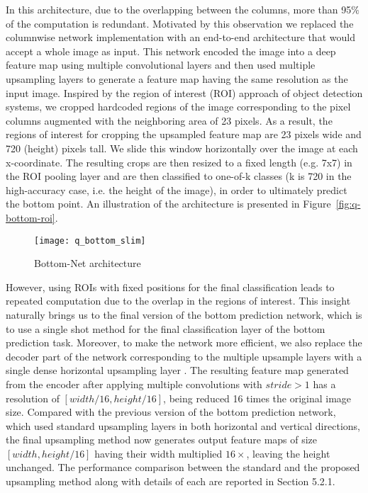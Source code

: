 \documentclass[10pt,twocolumn,letterpaper]{article}
\begin{document}
In this architecture, due to the overlapping between the columns, more than 95$\%$ of the computation is redundant. Motivated by this observation we replaced the columnwise network implementation with an end-to-end architecture that would accept a whole image as input. This network encoded the image into a deep feature map using multiple convolutional layers and then used multiple upsampling layers to generate a feature map having the same resolution as the input image. Inspired by the region of interest (ROI) approach of object detection systems, we cropped hardcoded regions of the image corresponding to the pixel columns augmented with the neighboring area of 23 pixels. As a result, the regions of interest for cropping the upsampled feature map are 23 pixels wide and 720 (height) pixels tall. We slide this window horizontally over the image at each x-coordinate. The resulting crops are then resized to a fixed length (e.g. 7x7) in the ROI pooling layer and are then classified to one-of-k classes (k is 720 in the high-accuracy case, i.e. the height of the image), in order to ultimately predict the bottom point. An illustration of the architecture is presented in Figure~\ref{fig:q-bottom-roi}. 
\begin{figure*}
\begin{center}
\texttt{[image: q\_bottom\_slim]}
\end{center}
   \caption{Bottom-Net architecture}
\label{fig:q_bottom_slim}
\end{figure*}

However, using ROIs with fixed positions for the final classification leads to repeated computation due to the overlap in the regions of interest. This insight naturally brings us to the final version of the bottom prediction network, which is to use a single shot method for the final classification layer of the bottom prediction task. Moreover, to make the network more efficient, we also replace the decoder part of the network corresponding to the multiple upsample layers with a single dense horizontal upsampling layer \cite{duc}. The resulting feature map generated from the encoder after applying multiple convolutions with $stride > 1$ has a resolution of $[width/16, height/16]$, being reduced 16 times the original image size. Compared with the previous version of the bottom prediction network, which used standard upsampling layers in both horizontal and vertical directions, the final upsampling method now generates output feature maps of size $[width, height/16]$ having their width multiplied $16\times$, leaving the height unchanged. The performance comparison between the standard and the proposed upsampling method along with details of each are reported in Section 5.2.1.
\end{document}
